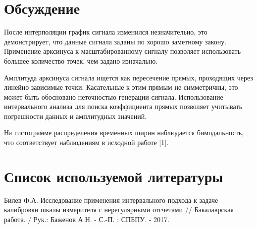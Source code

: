 \documentclass[12pt,a4paper]{article}
\begin{document}
\section{Обсуждение}
После интерполяции график сигнала изменился незначительно, это демонстрирует, что данные сигнала заданы по хорошо заметному закону. Применение арксинуса к масштабированному сигналу позволяет использовать большее количество точек, чем задано изначально.

Амплитуда арксинуса сигнала ищется как пересечение прямых, проходящих через
линейно зависимые точки. Касательные к этим прямым не симметричны, это может быть обосновано неточностью генерации сигнала. Использование интервального анализа для поиска коэффициента прямых позволяет учитывать погрешности данных и амплитудных значений.

На гистограмме распределения временных ширин наблюдается бимодальность, что соответствует наблюдениям в исходной работе [1].

\section{Список используемой литературы}
\begin{thebibliography}{1}
Билев Ф.А. Исследование применения интервального подхода к задаче калибровки шкалы измерителя с нерегулярными отсчетами // Бакалаврская работа. / Рук.: Баженов А.Н. - С.-П. : СПБПУ. - 2017.
\end{thebibliography}
\end{document}
